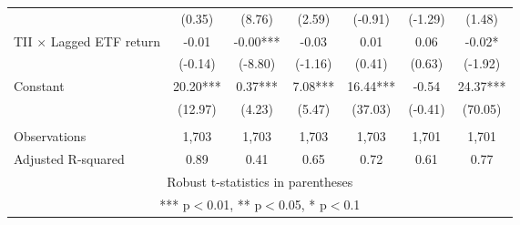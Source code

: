 \documentclass[]{article}
\begin{document}
\begin{tabular}{lcccccc}
 & (0.35) & (8.76) & (2.59) & (-0.91) & (-1.29) & (1.48) \\
TII $\times$ Lagged ETF return & -0.01 & -0.00*** & -0.03 & 0.01 & 0.06 & -0.02* \\
 & (-0.14) & (-8.80) & (-1.16) & (0.41) & (0.63) & (-1.92) \\
Constant & 20.20*** & 0.37*** & 7.08*** & 16.44*** & -0.54 & 24.37*** \\
 & (12.97) & (4.23) & (5.47) & (37.03) & (-0.41) & (70.05) \\
 &  &  &  &  &  &  \\
Observations & 1,703 & 1,703 & 1,703 & 1,703 & 1,701 & 1,701 \\
 Adjusted R-squared & 0.89 & 0.41 & 0.65 & 0.72 & 0.61 & 0.77 \\ \hline
\multicolumn{7}{c}{ Robust t-statistics in parentheses} \\
\multicolumn{7}{c}{ *** p$<$0.01, ** p$<$0.05, * p$<$0.1} \\
\end{tabular}
\end{document}
